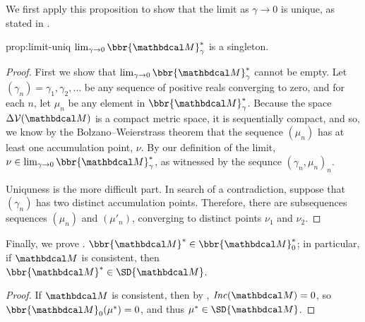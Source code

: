 We first apply this proposition to show that the limit as $\gamma \to 0$ is unique, as stated in .
\begin{old}{prop:limit-uniq}
$\lim_{\gamma\to0}\bbr{\dg M}_\gamma^*$ is a singleton.
\end{old}
\begin{proof}
First we show that $\lim_{\gamma \to 0}\bbr{\dg M}_\gamma^*$ cannot be empty.
Let $(\gamma_n) = \gamma_1, \gamma_2, \ldots$ be any sequence of positive reals
converging to zero, and for each $n$, let $\mu_n$ be any element in $\bbr{\dg
M}_\gamma^*$. Because the space $\Delta\V(\dg M)$ is a compact metric space, it is sequentially compact, and so, we know by the
Bolzano–Weierstrass theorem that the sequence $(\mu_n)$ has at least one
accumulation point, $\nu$. By our definition of the limit, $\nu \in
\lim_{\gamma\to0}\bbr{\dg M}_\gamma^*$, as witnessed by the sequnce $(\gamma_n, \mu_n)_n$.

Uniquness is the more difficult part. In search of a contradiction, suppose that
$(\gamma_n)$ has two distinct accumulation points. Therefore, there are
subsequences sequences $(\mu_n)$ and $(\mu'_n)$, converging to distinct points
$\nu_1$ and $\nu_2$. 
\end{proof}

Finally, we prove .
$\bbr{\dg M}^* \in \bbr{\dg M}_0^*$; in particular, if $\dg M$ is consistent,
then $\bbr{\dg M}^* \in \SD{\dg  M}$.
\eopro


\begin{proof}

If $\dg M$ is consistent, then by ,
$\Inc({\dg M}) = 0$, so $\bbr{\dg M}_0(\mu^*) = 0$, and thus $\mu^*
\in \SD{\dg M}$. 

	\end{proof}


